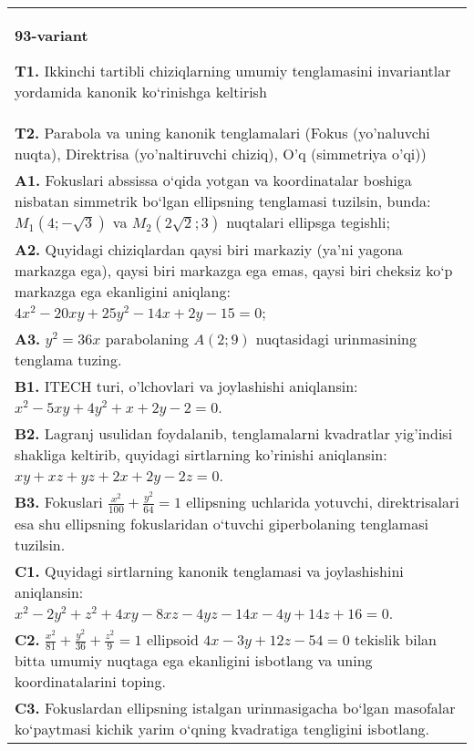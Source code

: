 \documentclass{article}
\begin{document}
\begin{tabular}{m{17cm}}
\textbf{93-variant}
\newline

\textbf{T1.} Ikkinchi tartibli chiziqlarning umumiy tenglamasini invariantlar yordamida kanonik ko‘rinishga keltirish \\
\textbf{T2.} Parabola va uning kanonik tenglamalari (Fokus (yo’naluvchi nuqta), Direktrisa (yo’naltiruvchi chiziq), O’q (simmetriya o’qi)) \\
\textbf{A1.} Fokuslari abssissa o‘qida yotgan va koordinatalar boshiga nisbatan simmetrik bo‘lgan ellipsning tenglamasi tuzilsin, bunda: $M_1(4 ;-\sqrt{3})$ va $M_2(2 \sqrt{2} ; 3)$ nuqtalari ellipsga tegishli; \\
\textbf{A2.} Quyidagi chiziqlardan qaysi biri markaziy (ya’ni yagona markazga ega), qaysi biri markazga ega emas, qaysi biri cheksiz ko‘p markazga ega ekanligini aniqlang: $4 x^2-20 x y+25 y^2-14 x+2 y-15=0$; \\
\textbf{A3.} $y^2=36 x$ parabolaning $A(2 ; 9)$ nuqtasidagi urinmasining tenglama tuzing. \\
\textbf{B1.} ITECH turi, o'lchovlari va joylashishi aniqlansin: $x^2-5 x y+4 y^2+x+2 y-2=0$. \\
\textbf{B2.} Lagranj usulidan foydalanib, tenglamalarni kvadratlar yig'indisi shakliga keltirib, quyidagi sirtlarning ko'rinishi aniqlansin: $x y+x z+y z+2 x+2 y-2 z=0$. \\
\textbf{B3.} Fokuslari $\frac{x^2}{100}+\frac{y^2}{64}=1$ ellipsning uchlarida yotuvchi, direktrisalari esa shu ellipsning fokuslaridan o‘tuvchi giperbolaning tenglamasi tuzilsin. \\
\textbf{C1.} Quyidagi sirtlarning kanonik tenglamasi va joylashishini aniqlansin: $x^2-2 y^2+z^2+4 x y-8 x z-4 y z-14 x-4 y+14 z+16=0$. \\
\textbf{C2.} $\frac{x^2}{81}+\frac{y^2}{36}+\frac{z^2}{9}=1$ ellipsoid $4 x-3 y+12 z-54=0$ tekislik bilan bitta umumiy nuqtaga ega ekanligini isbotlang va uning koordinatalarini toping. \\
\textbf{C3.} Fokuslardan ellipsning istalgan urinmasigacha bo‘lgan masofalar ko‘paytmasi kichik yarim o‘qning kvadratiga tengligini isbotlang. \\

\end{tabular}
\vspace{1cm}
\end{document}
